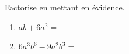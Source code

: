 %
%
    Factorise en mettant en évidence.
    \begin{enumerate}
        \item \(ab+6a^2=\)
        \item \(6a^3b^6 - 9a^2b^3=\)
    \end{enumerate}
